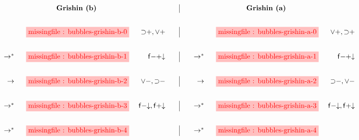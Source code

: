 \setlength{\fboxsep}{2pt}
\setlength{\arraycolsep}{0pt}
\newcommand{\vsp}{\vspace{2em}}
$$
\begin{array}[t]{rcr@{\qquad}|@{\qquad}rcr@{\vsp}}
       &\text{\textbf{Grishin (b)}} &&
       &\text{\textbf{Grishin (a)}} & \\

       &\stkfig{1}{bubbles-grishin-b-0} &{\limp}{+}, {\lor}{+} &
       &\stkfig{1}{bubbles-grishin-a-0} &{\lor}{+}, {\limp}{+} \\

\steps &\stkfig{1}{bubbles-grishin-b-1} &{\mathsf{f{-}{+}{\da}}} &
\steps &\stkfig{1}{bubbles-grishin-a-1} &{\mathsf{f{-}{+}{\da}}} \\

\step  &\stkfig{1}{bubbles-grishin-b-2} &{\lor}{-}, {\limp}{-} &
\step  &\stkfig{1}{bubbles-grishin-a-2} &{\limp}{-}, {\lor}{-} \\

\steps &\stkfig{1}{bubbles-grishin-b-3} &\mathsf{f{-}{\da}}, \mathsf{f{+}{\da}} &
\steps &\stkfig{1}{bubbles-grishin-a-3} &\mathsf{f{-}{\da}}, \mathsf{f{+}{\da}} \\

\steps &\stkfig{1}{bubbles-grishin-b-4} & &
\steps &\stkfig{1}{bubbles-grishin-a-4} &
\end{array}
$$
